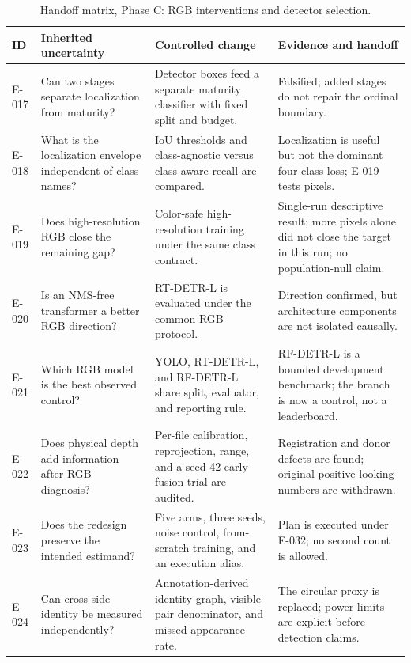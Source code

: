 \begin{table}[t]
\centering\footnotesize
\caption{Handoff matrix, Phase C: RGB interventions and detector selection.}
\begin{tabularx}{\textwidth}{L{0.07\textwidth}L{0.24\textwidth}Y Y}
\toprule
\textbf{ID} & \textbf{Inherited uncertainty} & \textbf{Controlled change} & \textbf{Evidence and handoff}\\
\midrule
E-017 & Can two stages separate localization from maturity? & Detector boxes feed a separate maturity classifier with fixed split and budget. & Falsified; added stages do not repair the ordinal boundary.\\
E-018 & What is the localization envelope independent of class names? & IoU thresholds and class-agnostic versus class-aware recall are compared. & Localization is useful but not the dominant four-class loss; E-019 tests pixels.\\
E-019 & Does high-resolution RGB close the remaining gap? & Color-safe high-resolution training under the same class contract. & Single-run descriptive result; more pixels alone did not close the target in this run; no population-null claim.\\
E-020 & Is an NMS-free transformer a better RGB direction? & RT-DETR-L is evaluated under the common RGB protocol. & Direction confirmed, but architecture components are not isolated causally.\\
E-021 & Which RGB model is the best observed control? & YOLO, RT-DETR-L, and RF-DETR-L share split, evaluator, and reporting rule. & RF-DETR-L is a bounded development benchmark; the branch is now a control, not a leaderboard.\\
E-022 & Does physical depth add information after RGB diagnosis? & Per-file calibration, reprojection, range, and a seed-42 early-fusion trial are audited. & Registration and donor defects are found; original positive-looking numbers are withdrawn.\\
E-023 & Does the redesign preserve the intended estimand? & Five arms, three seeds, noise control, from-scratch training, and an execution alias. & Plan is executed under E-032; no second count is allowed.\\
E-024 & Can cross-side identity be measured independently? & Annotation-derived identity graph, visible-pair denominator, and missed-appearance rate. & The circular proxy is replaced; power limits are explicit before detection claims.\\
\bottomrule
\end{tabularx}
\end{table}

